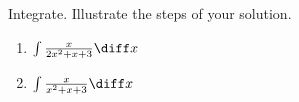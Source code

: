 Integrate. Illustrate the steps of your solution.
\begin{enumerate}
\item $
\int \frac{x}{ 2x^2+x+3}\diff x
$
\item $
\int \frac{x}{ x^2+x+3}\diff x
$
\end{enumerate}
